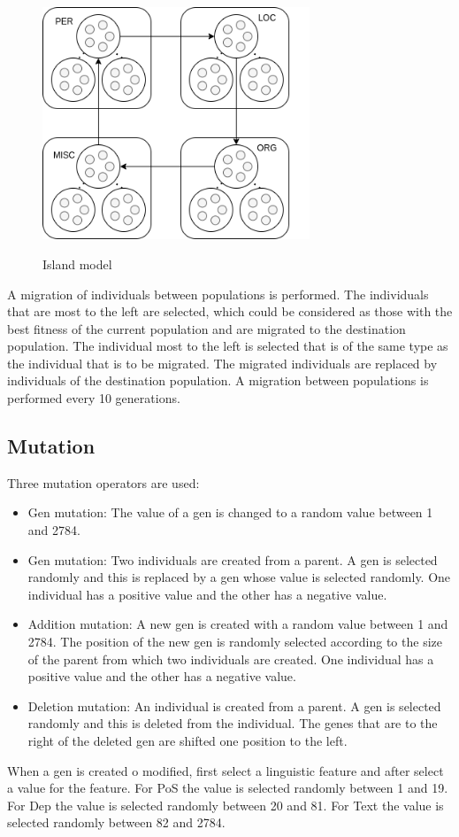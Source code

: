 \documentclass{IEEEtran}
\begin{document}
\begin{figure}[ht]
  \caption{Island model}
  \centering
  \includegraphics[width=8cm]{img/island_ae.png}
  \label{fig:island}
\end{figure}

A migration of individuals between populations is performed. The individuals that are most to the left are selected, which could be considered as those with the best fitness of the current population and are migrated to the destination population. The individual most to the left is selected that is of the same type as the individual that is to be migrated. The migrated individuals are replaced by individuals of the destination population. A migration between populations is performed every 10 generations.

\subsection{Mutation}

Three mutation operators are used:
\begin{itemize}
  \item  Gen mutation: The value of a gen is changed to a random value between 1 and 2784.
  \item Gen mutation: Two individuals are created from a parent. A gen is selected randomly and this is replaced by a gen whose value is selected randomly. One individual has a positive value and the other has a negative value.
  \item  Addition mutation: A new gen is created with a random value between 1 and 2784. The position of the new gen is randomly selected according to the size of the parent from which two individuals are created. One individual has a positive value and the other has a negative value.
  \item Deletion mutation: An individual is created from a parent. A gen is selected randomly and this is deleted from the individual. The genes that are to the right of the deleted gen are shifted one position to the left.
\end{itemize}
When a gen is created o modified, first select a linguistic feature and after select a value for the feature. For PoS the value is selected randomly between 1 and 19. For Dep the value is selected randomly between 20 and 81. For Text the value is selected randomly between 82 and 2784.
\end{document}
